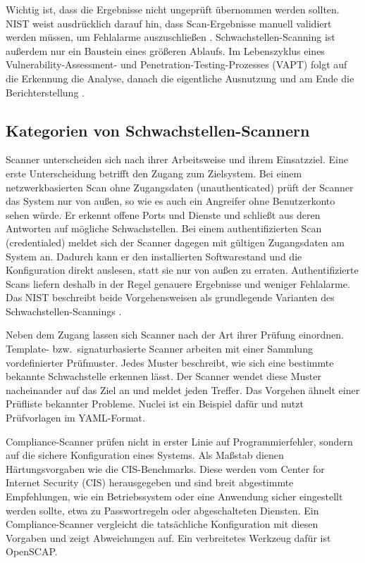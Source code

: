 Wichtig ist, dass die Ergebnisse nicht ungeprüft übernommen werden sollten. NIST weist
ausdrücklich darauf hin, dass Scan-Ergebnisse manuell validiert werden müssen, um Fehlalarme
auszuschließen \cite{NISTSP800115}. Schwachstellen-Scanning ist außerdem nur ein Baustein eines
größeren Ablaufs. Im Lebenszyklus eines Vulnerability-Assessment- und Penetration-Testing-Prozesses
(VAPT) folgt auf die Erkennung die Analyse, danach die eigentliche Ausnutzung und am Ende die
Berichterstellung \cite[67--69]{IntroductionCyberRanges2022}.

\subsection{Kategorien von Schwachstellen-Scannern}
\label{subsec:scan-kategorien}

Scanner unterscheiden sich nach ihrer Arbeitsweise und ihrem Einsatzziel. Eine erste Unterscheidung
betrifft den Zugang zum Zielsystem. Bei einem netzwerkbasierten Scan ohne Zugangsdaten
(unauthenticated) prüft der Scanner das System nur von außen, so wie es auch ein Angreifer ohne
Benutzerkonto sehen würde. Er erkennt offene Ports und Dienste und schließt aus deren Antworten auf
mögliche Schwachstellen. Bei einem authentifizierten Scan (credentialed) meldet sich der Scanner
dagegen mit gültigen Zugangsdaten am System an. Dadurch kann er den installierten Softwarestand und
die Konfiguration direkt auslesen, statt sie nur von außen zu erraten. Authentifizierte Scans
liefern deshalb in der Regel genauere Ergebnisse und weniger Fehlalarme. Das NIST beschreibt beide
Vorgehensweisen als grundlegende Varianten des Schwachstellen-Scannings \cite{NISTSP800115}.

Neben dem Zugang lassen sich Scanner nach der Art ihrer Prüfung einordnen. Template- bzw.\
signaturbasierte Scanner arbeiten mit einer Sammlung vordefinierter Prüfmuster. Jedes Muster
beschreibt, wie sich eine bestimmte bekannte Schwachstelle erkennen lässt. Der Scanner wendet diese
Muster nacheinander auf das Ziel an und meldet jeden Treffer. Das Vorgehen ähnelt einer Prüfliste
bekannter Probleme. Nuclei ist ein Beispiel dafür und nutzt Prüfvorlagen im YAML-Format.

Compliance-Scanner prüfen nicht in erster Linie auf Programmierfehler, sondern auf die sichere
Konfiguration eines Systems. Als Maßstab dienen Härtungsvorgaben wie die CIS-Benchmarks. Diese
werden vom Center for Internet Security (CIS) herausgegeben und sind breit abgestimmte
Empfehlungen, wie ein Betriebssystem oder eine Anwendung sicher eingestellt werden sollte, etwa zu
Passwortregeln oder abgeschalteten Diensten. Ein Compliance-Scanner vergleicht die tatsächliche
Konfiguration mit diesen Vorgaben und zeigt Abweichungen auf. Ein verbreitetes Werkzeug dafür ist
OpenSCAP.

